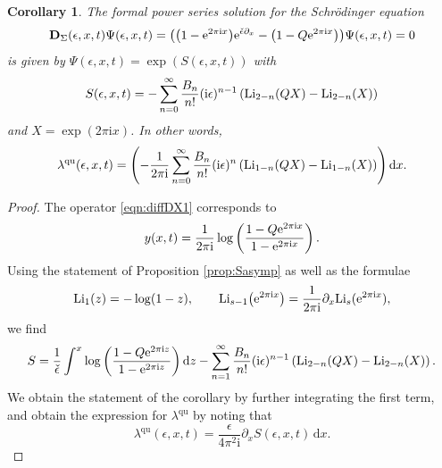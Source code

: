 \documentclass[pdftex]{sigma}
\numberwithin{equation}{section}
\newtheorem{Corollary}[Theorem]{Corollary}
\begin{document}
\begin{Corollary}\label{col:formalS}
The formal power series solution for the Schr\"odinger equation
\begin{equation}\label{scheq}
 \mathbf{D}_\Sigma (\epsilon,x,t) \Psi(\epsilon,x,t)= \big(\big(1-{\rm e}^{2 \pi \mathrm{i} x}\big) {\rm e}^{\check{\epsilon} \partial_x} - \big(1 - Q {\rm e}^{2 \pi \mathrm{i} x}\big)\big)\Psi(\epsilon,x,t)=0
\end{equation}
is given by
$\Psi(\epsilon,x,t)=\exp(S(\epsilon,x,t)) $
with
\begin{equation}\label{eq:Sasymp}
 S(\epsilon,x,t)= - \sum_{n=0}^{\infty} \frac{B_n}{n!} (\mathrm{i}\epsilon)^{n-1} \left( {\rm Li}_{2-n}(Q X)-{\rm Li}_{2-n}(X)\right)
\end{equation}
and $X=\exp(2\pi \mathrm{i} x)$. In other words,
\begin{equation*}%
\lambda^{\text{qu}}(\epsilon,x,t)=\left(- \frac{1}{2\pi \mathrm{i}}\sum_{n=0}^{\infty} \frac{B_n}{n!} (\mathrm{i}\epsilon)^{n} \left( {\rm Li}_{1-n}(Q X)-{\rm Li}_{1-n}(X)\right) \right) \mathrm{d}x.
\end{equation*}
\end{Corollary}
\begin{proof}
The operator \eqref{eqn:diffDX1} corresponds to
\begin{equation*} y(x,t)= \frac{1}{2\pi \mathrm{i}} \log \left( \frac{1-Q{\rm e}^{2\pi \mathrm{i} x}}{1-{\rm e}^{2\pi \mathrm{i} x}}\right).\end{equation*}
Using the statement of Proposition \ref{prop:Sasymp} as well as the formulae
\begin{equation*}{\rm Li}_1(z)=-\log(1-z),\qquad {\rm Li}_{s-1}\big({\rm e}^{2 \pi \mathrm{i} x}\big) = \frac{1}{2 \pi \mathrm{i}} \partial_x {\rm Li}_{s}({\rm e}^{2 \pi \mathrm{i} x}),
\end{equation*}
we find
\begin{equation*}
 S= \frac{1}{\check{\epsilon}} \int^x \log \left( \frac{1-Q{\rm e}^{2\pi \mathrm{i} z}}{1-{\rm e}^{2\pi \mathrm{i} z}}\right) {\rm d}z - \sum_{n=1}^{\infty} \frac{B_n}{n!} (\mathrm{i}\epsilon)^{n-1} \left( {\rm Li}_{2-n}(Q X)-{\rm Li}_{2-n}(X)\right).
\end{equation*}
We obtain the statement of the corollary by further integrating the first term, and obtain the expression for $\lambda^{\text{qu}}$ by noting that
\begin{equation*}
 \lambda^{\text{qu}}(\epsilon,x,t)= \frac{\epsilon}{4\pi^2 \mathrm{i}} \partial_x S(\epsilon,x,t) \, \mathrm{d}x.\tag*{\qed}
\end{equation*}
\renewcommand{\qed}{}
\end{proof}
\end{document}
